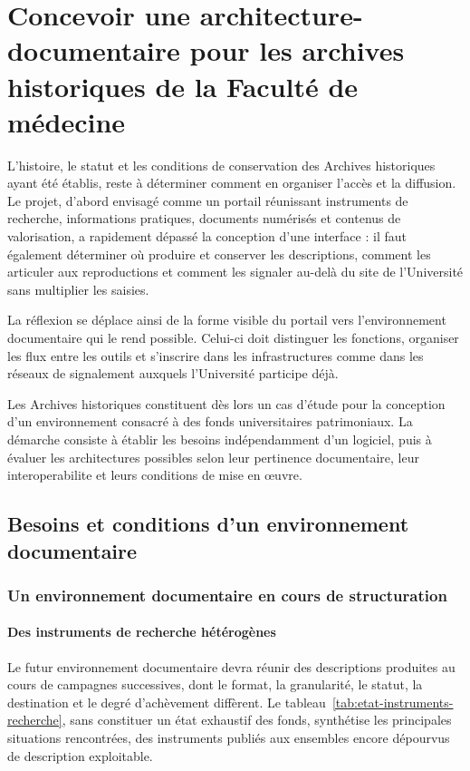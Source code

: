 \part{Concevoir une \gls{architecture-documentaire} pour les archives historiques de la Faculté de médecine}
\label{part:architecture}

L'histoire, le statut et les conditions de conservation des Archives historiques ayant été établis, reste à déterminer comment en organiser l'accès et la diffusion. Le projet, d'abord envisagé comme un portail réunissant instruments de recherche, informations pratiques, documents numérisés et contenus de valorisation, a rapidement dépassé la conception d'une interface : il faut également déterminer où produire et conserver les descriptions, comment les articuler aux reproductions et comment les signaler au-delà du site de l'Université sans multiplier les saisies.

La réflexion se déplace ainsi de la forme visible du portail vers l'environnement documentaire qui le rend possible. Celui-ci doit distinguer les fonctions, organiser les flux entre les outils et s'inscrire dans les infrastructures comme dans les réseaux de \gls{signalement} auxquels l'Université participe déjà.

Les Archives historiques constituent dès lors un cas d'étude pour la conception d'un environnement consacré à des fonds universitaires patrimoniaux. La démarche consiste à établir les besoins indépendamment d'un logiciel, puis à évaluer les architectures possibles selon leur pertinence documentaire, leur \gls{interoperabilite} et leurs conditions de mise en œuvre.

\chapter{Besoins et conditions d'un environnement documentaire}
\label{chap:besoins}

\section{Un environnement documentaire en cours de structuration}
\label{sec:etat-lieux-documentaire}

\subsection{Des instruments de recherche hétérogènes}

Le futur environnement documentaire devra réunir des descriptions produites au cours de campagnes successives, dont le format, la granularité, le statut, la destination et le degré d'achèvement diffèrent. Le tableau~\ref{tab:etat-instruments-recherche}, sans constituer un état exhaustif des fonds, synthétise les principales situations rencontrées, des instruments publiés aux ensembles encore dépourvus de description exploitable.

